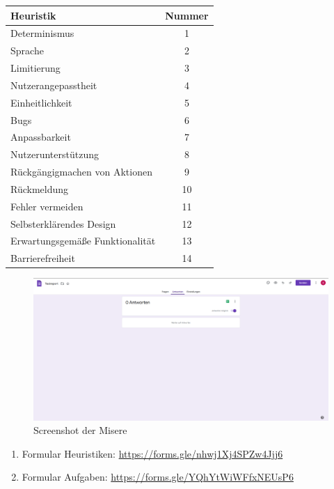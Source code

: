 \documentclass[12pt, aspectratio=169]{beamer}
\begin{document}
\begin{frame}
	\centering
	\begin{tabular}{|l|c|}
		\hline
		\textbf{Heuristik} & \textbf{Nummer} \\ \hline
		Determinismus& 1\\ \hline
		Sprache& 2\\ \hline
		Limitierung& 3\\ \hline
		Nutzerangepasstheit& 4\\ \hline
		Einheitlichkeit& 5\\ \hline
		Bugs& 6\\ \hline
		Anpassbarkeit& 7\\ \hline
		Nutzerunterstützung& 8\\ \hline
		Rückgängigmachen von Aktionen& 9\\ \hline
		Rückmeldung& 10\\ \hline
		Fehler vermeiden& 11\\ \hline
		Selbsterklärendes Design& 12\\ \hline
		Erwartungsgemäße Funktionalität& 13\\ \hline
		Barrierefreiheit& 14\\ \hline
		
	\end{tabular}
\end{frame}

\begin{frame}
	\hspace*{-20px}
	
\end{frame}

\begin{frame}
	\begin{figure}
		\includegraphics[height=0.6\textheight]{image/misere.png}
		\caption{Screenshot der Misere}
	\end{figure}
	\begin{enumerate}
		\item Formular Heuristiken: \url{https://forms.gle/nhwj1Xj4SPZw4Jjj6}
		\item Formular Aufgaben: \url{https://forms.gle/YQhYtWiWFfxNEUsP6}
	\end{enumerate}
\end{frame}
\end{document}
